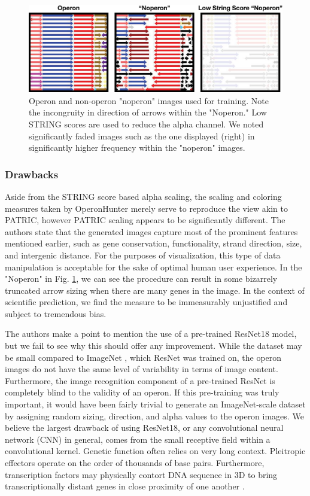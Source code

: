 \documentclass{article}
\begin{document}
\begin{figure} 
  \centering
  \includegraphics[width=.5\textwidth]{images/OperonHunter Image.eps}
  \caption{Operon and non-operon "noperon" images used for training. Note the incongruity in direction of arrows within the "Noperon." Low STRING scores are used to reduce the alpha channel. We noted significantly faded images such as the one displayed (right) in significantly higher frequency within the "noperon" images.}
  \label{fig:operonhunterdata}
\end{figure}

\subsubsection{Drawbacks}

Aside from the STRING score based alpha scaling, the scaling and coloring measures taken by OperonHunter merely serve to reproduce the view akin to PATRIC, however PATRIC scaling appears to be significantly different. The authors state that the generated images capture most of the prominent features mentioned earlier, such as gene conservation, functionality, strand direction, size, and intergenic distance. For the purposes of visualization, this type of data manipulation is acceptable for the sake of optimal human user experience. In the "Noperon" in Fig. \ref{fig:operonhunterdata}, we can see the procedure can result in some bizarrely truncated arrow sizing when there are many genes in the image. In the context of scientific prediction, we find the measure to be immeasurably unjustified and subject to tremendous bias.  

The authors make a point to mention the use of a pre-trained ResNet18 model, but we fail to see why this should offer any improvement. While the dataset may be small compared to ImageNet \cite{krizhevsky_imagenet_2012}, which ResNet was trained on, the operon images do not have the same level of variability in terms of image content. Furthermore, the image recognition component of a pre-trained ResNet is completely blind to the validity of an operon. If this pre-training was truly important, it would have been fairly trivial to generate an ImageNet-scale dataset by assigning random sizing, direction, and alpha values to the operon images. We believe the largest drawback of using ResNet18, or any convolutional neural network (CNN) in general, comes from the small receptive field within a convolutional kernel. Genetic function often relies on very long context. Pleitropic effectors operate on the order of thousands of base pairs. Furthermore, transcription factors may physically contort DNA sequence in 3D to bring transcriptionally distant genes in close proximity of one another \cite{vamosi_dna_2018}.
\end{document}
